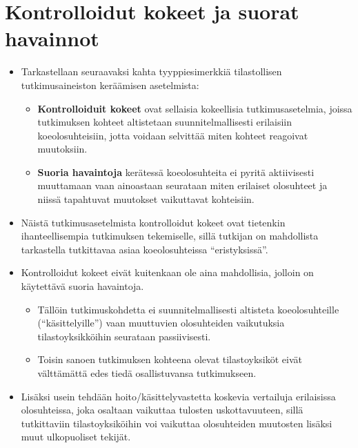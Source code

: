 \documentclass[
]{book}
\providecommand{\tightlist}{%
  \setlength{\itemsep}{0pt}\setlength{\parskip}{0pt}}
\begin{document}
\hypertarget{alaluku54}{%
\section{Kontrolloidut kokeet ja suorat havainnot}\label{alaluku54}}

\begin{itemize}
\item
  Tarkastellaan seuraavaksi kahta tyyppiesimerkkiä tilastollisen tutkimusaineiston keräämisen asetelmista:

  \begin{itemize}
  \tightlist
  \item
    \textbf{Kontrolloiduit kokeet} ovat sellaisia kokeellisia tutkimusasetelmia, joissa tutkimuksen kohteet altistetaan suunnitelmallisesti erilaisiin koeolosuhteisiin, jotta voidaan selvittää miten kohteet reagoivat muutoksiin.
  \item
    \textbf{Suoria havaintoja} kerätessä koeolosuhteita ei pyritä aktiivisesti muuttamaan vaan ainoastaan seurataan miten erilaiset olosuhteet ja niissä tapahtuvat muutokset vaikuttavat kohteisiin.
  \end{itemize}
\item
  Näistä tutkimusasetelmista kontrolloidut kokeet ovat tietenkin ihanteellisempia tutkimuksen tekemiselle, sillä tutkijan on mahdollista tarkastella tutkittavaa asiaa koeolosuhteissa ``eristyksissä''.
\item
  Kontrolloidut kokeet eivät kuitenkaan ole aina mahdollisia, jolloin on käytettävä suoria havaintoja.

  \begin{itemize}
  \tightlist
  \item
    Tällöin tutkimuskohdetta ei suunnitelmallisesti altisteta koeolosuhteille (``käsittelyille'') vaan muuttuvien olosuhteiden vaikutuksia tilastoyksikköihin seurataan passiivisesti.
  \item
    Toisin sanoen tutkimuksen kohteena olevat tilastoyksiköt eivät välttämättä edes tiedä osallistuvansa tutkimukseen.
  \end{itemize}
\item
  Lisäksi usein tehdään hoito/käsittelyvastetta koskevia vertailuja erilaisissa olosuhteissa, joka osaltaan vaikuttaa tulosten uskottavuuteen, sillä tutkittaviin tilastoyksiköihin voi vaikuttaa olosuhteiden muutosten lisäksi muut ulkopuoliset tekijät.


\end{itemize}
\end{document}
